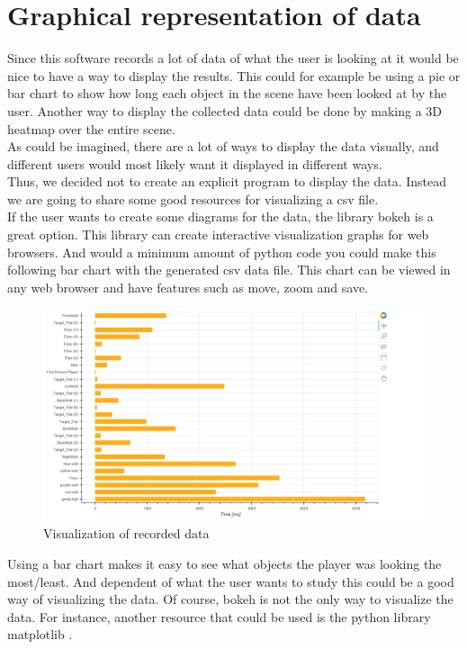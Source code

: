 \documentclass[letterpaper]{article}
\begin{document}
\section{Graphical representation of data}
Since this software records a lot of data of what the user is looking at it would be nice to have a way to display the results. This could for example be using a pie or bar chart to show how long each object in the scene have been looked at by the user. Another way to display the collected data could be done by making a 3D heatmap over the entire scene.\\[0.15in]
As could be imagined, there are a lot of ways to display the data visually, and different users would most likely want it displayed in different ways.\\[0.15in]
Thus, we decided not to create an explicit program to display the data. Instead we are going to share some good resources for visualizing a csv file.\\[0.15in]
If the user wants to create some diagrams for the data, the library bokeh \cite{bokeh} is a great option. This library can create interactive visualization graphs for web browsers. And would a minimum amount of python code you could make this following bar chart with the generated csv data file. This chart can be viewed in any web browser and have features such as move, zoom and save.
\newpage
\begin{figure}[h!]
  \centering \includegraphics[keepaspectratio,scale=0.3]{GraphStuff.png}
  \caption{Visualization of recorded data}
  \label{fig:graphvisualization}
\end{figure}
\noindent Using a bar chart makes it easy to see what objects the player was looking the most/least. And dependent of what the user wants to study this could be a good way of visualizing the data.
Of course, bokeh is not the only way to visualize the data. For instance, another resource that could be used is the python library matplotlib \cite{matplotlib}.
\newpage
\end{document}
